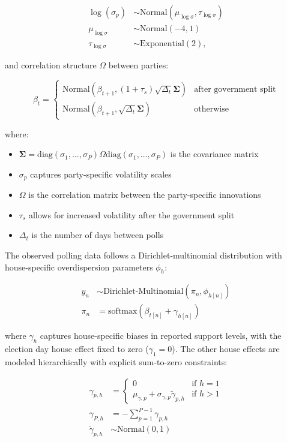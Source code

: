 \documentclass[
  letterpaper,
  DIV=11,
  numbers=noendperiod]{scrartcl}
\providecommand{\tightlist}{%
  \setlength{\itemsep}{0pt}\setlength{\parskip}{0pt}}\usepackage{longtable,booktabs,array}
\begin{document}
\[
\begin{aligned}
\log(\sigma_p) &\sim \text{Normal}(\mu_{\log\sigma}, \tau_{\log\sigma}) \\
\mu_{\log\sigma} &\sim \text{Normal}(-4, 1) \\
\tau_{\log\sigma} &\sim \text{Exponential}(2),
\end{aligned}
\]

and correlation structure \(\Omega\) between parties:

\[
\beta_{t} = \begin{cases}
\mathrm{Normal}\left(\beta_{t+1}, (1 + \tau_s)\sqrt{\Delta_t} \boldsymbol \Sigma\right) & \text{after government split} \\
\mathrm{Normal}\left(\beta_{t+1}, \sqrt{\Delta_t} \boldsymbol \Sigma\right) & \text{otherwise}
\end{cases}
\]

where:

\begin{itemize}
\tightlist
\item
  \(\boldsymbol \Sigma = \text{diag}(\sigma_1,\ldots,\sigma_P) \Omega \text{diag}(\sigma_1,\ldots,\sigma_P)\)
  is the covariance matrix
\item
  \(\sigma_p\) captures party-specific volatility scales
\item
  \(\Omega\) is the correlation matrix between the party-specific
  innovations
\item
  \(\tau_s\) allows for increased volatility after the government split
\item
  \(\Delta_t\) is the number of days between polls
\end{itemize}

The observed polling data follows a Dirichlet-multinomial distribution
with house-specific overdispersion parameters \(\phi_h\):

\[
\begin{aligned}
y_n &\sim \text{Dirichlet-Multinomial}(\pi_n, \phi_{h[n]}) \\
\pi_n &= \text{softmax}(\beta_{t[n]} + \gamma_{h[n]})
\end{aligned}
\]

where \(\gamma_{h}\) captures house-specific biases in reported support
levels, with the election day house effect fixed to zero
(\(\gamma_1 = 0\)). The other house effects are modeled hierarchically
with explicit sum-to-zero constraints:

\[
\begin{aligned}
\gamma_{p,h} &= \begin{cases}
0 & \text{if } h = 1 \\
\mu_{\gamma,p} + \sigma_{\gamma,p}\tilde{\gamma}_{p,h} & \text{if } h > 1
\end{cases} \\
\gamma_{P,h} &= -\sum_{p=1}^{P-1} \gamma_{p,h} \\
\tilde{\gamma}_{p,h} &\sim \text{Normal}(0, 1)
\end{aligned}
\]
\end{document}

